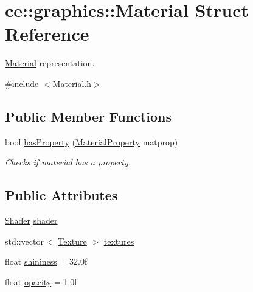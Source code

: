 \hypertarget{structce_1_1graphics_1_1_material}{}\section{ce\+:\+:graphics\+:\+:Material Struct Reference}
\label{structce_1_1graphics_1_1_material}


\hyperlink{structce_1_1graphics_1_1_material}{Material} representation.  




{\ttfamily \#include $<$Material.\+h$>$}

\subsection*{Public Member Functions}
\begin{DoxyCompactItemize}
\item 
\mbox{\label{structce_1_1graphics_1_1_material_af33c976594ddcca02b16b7fbf64d429a}} 
bool \hyperlink{structce_1_1graphics_1_1_material_af33c976594ddcca02b16b7fbf64d429a}{has\+Property} (\hyperlink{_material_8h_aac4ec325697a8f788007e105d586d217}{Material\+Property} matprop)
\begin{DoxyCompactList}\small\item\em Checks if material has a property. \end{DoxyCompactList}\end{DoxyCompactItemize}
\subsection*{Public Attributes}
\begin{DoxyCompactItemize}
\item 
\hyperlink{classce_1_1graphics_1_1_shader}{Shader} \hyperlink{structce_1_1graphics_1_1_material_a583b33732dc9ed17a20d9d1bcd636a52}{shader}
\item 
std\+::vector$<$ \hyperlink{structce_1_1graphics_1_1_texture}{Texture} $>$ \hyperlink{structce_1_1graphics_1_1_material_ad14fc2a8d3a7d9241226471f8f2e2fcc}{textures}
\item 
float \hyperlink{structce_1_1graphics_1_1_material_a62ed7d4af263dbdd7065a9b664bfab6e}{shininess} = 32.\+0f
\item 
float \hyperlink{structce_1_1graphics_1_1_material_ad6f3a5c250e374b47ca6bbefb75b8a6c}{opacity} = 1.\+0f
\end{DoxyCompactItemize}
